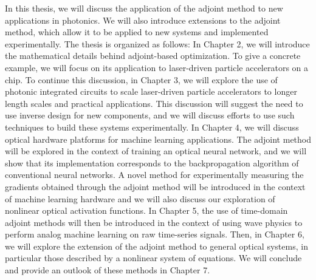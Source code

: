 In this thesis, we will discuss the application of the adjoint method to new applications in photonics.
We will also introduce extensions to the adjoint method, which allow it to be applied to new systems and implemented experimentally.
The thesis is organized as follows:
In Chapter 2, we will introduce the mathematical details behind adjoint-based optimization.  
To give a concrete example, we will focus on its application to laser-driven particle accelerators on a chip.
To continue this discussion, in Chapter 3, we will explore the use of photonic integrated circuits to scale laser-driven particle accelerators to longer length scales and practical applications.
This discussion will suggest the need to use inverse design for new components, and we will discuss efforts to use such techniques to build these systems experimentally.
In Chapter 4, we will discuss optical hardware platforms for machine learning applications.
The adjoint method will be explored in the context of training an optical neural network, and we will show that its implementation corresponds to the backpropagation algorithm of conventional neural networks.
A novel method for experimentally measuring the gradients obtained through the adjoint method will be introduced in the context of machine learning hardware and we will also discuss our exploration of nonlinear optical activation functions.
In Chapter 5, the use of time-domain adjoint methods will then be introduced in the context of using wave physics to perform analog machine learning on raw time-series signals.
Then, in Chapter 6, we will explore the extension of the adjoint method to general optical systems, in particular those described by a nonlinear system of equations.
We will conclude and provide an outlook of these methods in Chapter 7.
